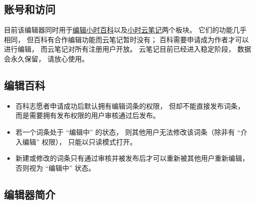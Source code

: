 \subsection{账号和访问}
目前该编辑器同时用于\href{http://wuli.wiki/editor/}{编辑小时百科}以及\href{http://wuli.wiki/note/}{小时云笔记}两个板块。 它们的功能几乎相同， 但百科有合作编辑功能而云笔记暂时没有； 百科需要申请成为作者才可以进行编辑， 而云笔记对所有注册用户开放。 云笔记目前已经进入稳定阶段， 数据会永久保留， 请放心使用。

\subsection{编辑百科}
\begin{itemize}
\item 百科志愿者申请成功后默认拥有编辑词条的权限， 但却不能直接发布词条， 而是需要拥有发布权限的用户审核通过后发布。
\item 若一个词条处于 “编辑中” 的状态， 则其他用户无法修改该词条（除非有 “介入编辑” 权限）， 只能以只读模式打开。
\item 新建或修改的词条只有通过审核并被发布后才可以重新被其他用户重新编辑， 否则视为 “编辑中” 状态。
\end{itemize}

\subsection{编辑器简介}

